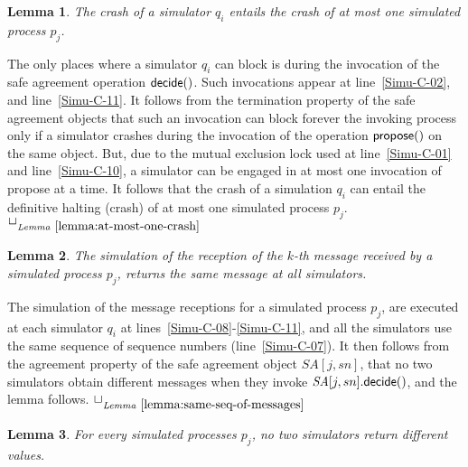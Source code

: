 \documentclass[11pt,letterpaper]{article}
\newtheorem{lemma}{Lemma}
\newlength {\afterproof}
\newcommand{\toto}{xxx}
\newenvironment{proofL}{\noindent{\bf Proof }}
{\hspace*{\fill}$\Box_{\mathit{Lemma}~\ref{\toto}}$\par\vspace{\afterproof}}
\newcommand{\SA}{\mathit{SA}}
\begin{document}
\begin{lemma}
\label{lemma:at-most-one-crash}
The crash of a simulator $q_i$ entails the crash of at most one simulated
 process $p_j$.
\end{lemma}

\begin{proofL}
The only places where a simulator $q_i$ can block is during the invocation of
the safe agreement operation ${\sf decide}()$. Such invocations appear at
line~\ref{Simu-C-02}, and line~\ref{Simu-C-11}. It follows from the
termination property of the safe agreement objects that such an invocation
can block forever the invoking process only if a simulator crashes
during the invocation of  the operation ${\sf propose}()$ on the same object.
But, due to the mutual exclusion lock used at line~\ref{Simu-C-01} and
line~\ref{Simu-C-10}, a simulator can be engaged in at most one
invocation of propose at a time. It follows that the crash of a simulation
$q_i$ can entail the definitive halting (crash) of at most one simulated
process $p_j$.
\renewcommand{\toto}{lemma:at-most-one-crash}
\end{proofL}

\begin{lemma}
\label{lemma:same-seq-of-messages}
The simulation of the reception of the $k$-th
message received by a simulated process $p_j$, returns the same message
at all simulators.
\end{lemma}

\begin{proofL}
The simulation of the message receptions for a simulated process $p_j$,
are executed at each simulator $q_i$ at lines~\ref{Simu-C-08}-\ref{Simu-C-11},
and all the simulators use the same sequence of sequence numbers
(line~\ref{Simu-C-07}).
It then follows from the agreement property of the safe agreement object
$\SA[j,sn]$, that no two simulators obtain different messages
when they invoke  $\SA[j,sn].{\sf decide}()$, and the lemma follows.
\renewcommand{\toto}{lemma:same-seq-of-messages}
\end{proofL}

\begin{lemma}
\label{lemma:one-dec-value}
For every simulated processes $p_j$, no two simulators return
different values.
\end{lemma}
\end{document}
